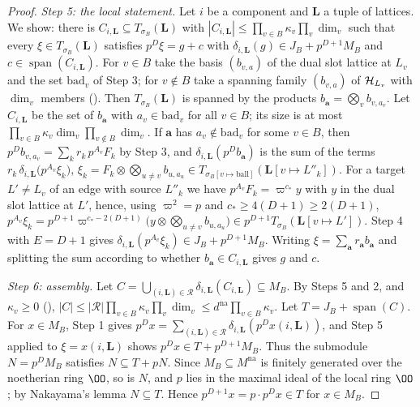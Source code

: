 \begin{proof}
\emph{Step 5: the local statement.} Let $i$ be a component and $\mathbf L$ a tuple of lattices. We show: there is
$C_{i,\mathbf L}\subseteq T_{\sigma_B}(\mathbf L)$ with $|C_{i,\mathbf L}|\le\prod_{v\in B}\kappa_v\prod_v\dim_v$ such that every
$\xi\in T_{\sigma_B}(\mathbf L)$ satisfies $p^D\xi=g+c$ with $\delta_{i,\mathbf L}(g)\in J_B+p^{D+1}M_B$ and
$c\in\operatorname{span}(C_{i,\mathbf L})$. For $v\in B$ take the basis $(b_{v,a})$ of the dual slot lattice at $L_v$ and the set
$\mathrm{bad}_v$ of Step 3; for $v\notin B$ take a spanning family $(b_{v,a})$ of $\mathcal H_{L_v}$ with $\dim_v$ members
(). Then $T_{\sigma_B}(\mathbf L)$ is spanned by the products
$b_{\mathbf a}=\bigotimes_vb_{v,a_v}$. Let $C_{i,\mathbf L}$ be the set of $b_{\mathbf a}$ with $a_v\in\mathrm{bad}_v$ for all
$v\in B$; its size is at most $\prod_{v\in B}\kappa_v\dim_v\prod_{v\notin B}\dim_v$. If $\mathbf a$ has $a_v\notin\mathrm{bad}_v$
for some $v\in B$, then $p^Db_{v,a_v}=\sum_kr_k\,p^{A_v}F_k$ by Step 3, and $\delta_{i,\mathbf L}(p^Db_{\mathbf a})$ is the sum of
the terms $r_k\,\delta_{i,\mathbf L}\bigl(p^{A_v}\xi_k\bigr)$, $\xi_k=F_k\otimes\bigotimes_{u\ne v}b_{u,a_u}\in
T_{\sigma_B[v\mapsto\mathrm{ball}]}(\mathbf L[v\mapsto L''_k])$. For a target $L'\ne L_v$ of an edge with source $L''_k$ we have
$p^{A_v}F_k=\varpi^{c_*}y$ with $y$ in the dual slot lattice at $L'$, hence, using $\varpi^2=p$ and $c_*\ge4(D+1)\ge2(D+1)$,
$p^{A_v}\xi_k=p^{D+1}\varpi^{c_*-2(D+1)}\bigl(y\otimes\bigotimes_{u\ne v}b_{u,a_u}\bigr)\in p^{D+1}T_{\sigma_B}(\mathbf L[v\mapsto L'])$.
Step 4 with $E=D+1$ gives $\delta_{i,\mathbf L}(p^{A_v}\xi_k)\in J_B+p^{D+1}M_B$. Writing $\xi=\sum_{\mathbf a}r_{\mathbf a}b_{\mathbf a}$
and splitting the sum according to whether $b_{\mathbf a}\in C_{i,\mathbf L}$ gives $g$ and $c$.

\emph{Step 6: assembly.} Let $C=\bigcup_{(i,\mathbf L)\in\mathcal R}\delta_{i,\mathbf L}(C_{i,\mathbf L})\subseteq M_B$. By Steps 5
and 2, and $\kappa_v\ge0$ (),
$|C|\le|\mathcal R|\prod_{v\in B}\kappa_v\prod_v\dim_v\le d^{\mathrm{na}}\prod_{v\in B}\kappa_v$. Let $T=J_B+\operatorname{span}(C)$.
For $x\in M_B$, Step 1 gives $p^Dx=\sum_{(i,\mathbf L)\in\mathcal R}\delta_{i,\mathbf L}(p^Dx(i,\mathbf L))$, and Step 5 applied to
$\xi=x(i,\mathbf L)$ shows $p^Dx\in T+p^{D+1}M_B$. Thus the submodule $N=p^DM_B$ satisfies $N\subseteq T+pN$. Since $M_B\subseteq
M^{\mathrm{na}}$ is finitely generated over the noetherian ring $\OO$, so is $N$, and $p$ lies in the maximal ideal of the local
ring $\OO$; by Nakayama's lemma $N\subseteq T$. Hence $p^{D+1}x=p\cdot p^Dx\in T$ for $x\in M_B$.
\end{proof}

